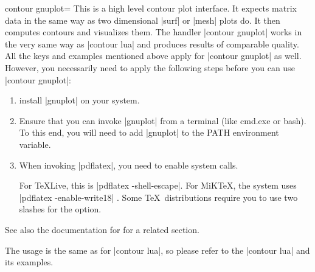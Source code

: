 {{\begin{plottype}[/pgfplots]{
    contour gnuplot=\textcolor{black}{}%
}
    This is a high level contour plot interface. It expects matrix data in the
    same way as two dimensional |surf| or |mesh| plots do. It then computes
    contours and visualizes them. The handler |contour gnuplot| works in the very same way as |contour lua| and produces results of comparable quality. All the keys and examples mentioned above apply for |contour gnuplot| as well. However, you necessarily need to apply the following steps before you can use |contour gnuplot|:
\begin{enumerate}
	\item install |gnuplot| on your system.
	\item Ensure that you can invoke |gnuplot| from a terminal (like cmd.exe or bash). To this end, you will need to add |gnuplot| to the PATH environment variable.
	\item When invoking |pdflatex|, you need to enable system calls. 

        For \TeX{}Live, this is |pdflatex -shell-escape|. For MiK\TeX{}, the system uses |pdflatex -enable-write18| . Some \TeX\ distributions require you to use two slashes for the option.
\end{enumerate}
	See also the documentation for  for a related section.



	The usage is the same as for |contour lua|, so please refer to the |contour lua| and its examples.

\pgfplotsexpensiveexample
\begin{codeexample}[]
\end{codeexample}

\pgfplotsexpensiveexample
\begin{codeexample}[]
\end{codeexample}
\end{plottype}

}}
